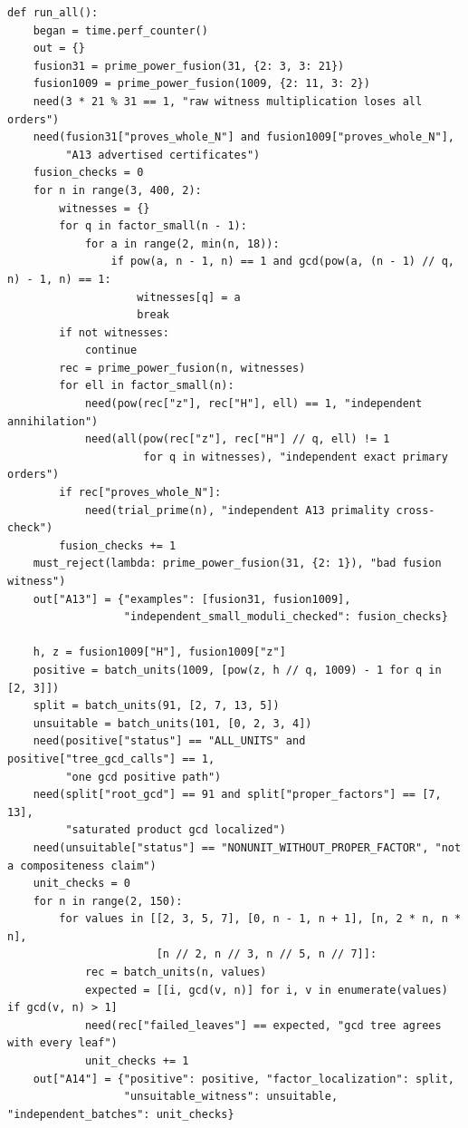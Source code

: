 \documentclass[11pt,a4paper]{article}
\theoremstyle{definition}\newtheorem{definition}[theorem]{Definition}
\theoremstyle{remark}\newtheorem{remark}[theorem]{Remark}
\begin{document}
\begin{lstlisting}[label=lst:certificates]
def run_all():
    began = time.perf_counter()
    out = {}
    fusion31 = prime_power_fusion(31, {2: 3, 3: 21})
    fusion1009 = prime_power_fusion(1009, {2: 11, 3: 2})
    need(3 * 21 % 31 == 1, "raw witness multiplication loses all orders")
    need(fusion31["proves_whole_N"] and fusion1009["proves_whole_N"],
         "A13 advertised certificates")
    fusion_checks = 0
    for n in range(3, 400, 2):
        witnesses = {}
        for q in factor_small(n - 1):
            for a in range(2, min(n, 18)):
                if pow(a, n - 1, n) == 1 and gcd(pow(a, (n - 1) // q, n) - 1, n) == 1:
                    witnesses[q] = a
                    break
        if not witnesses:
            continue
        rec = prime_power_fusion(n, witnesses)
        for ell in factor_small(n):
            need(pow(rec["z"], rec["H"], ell) == 1, "independent annihilation")
            need(all(pow(rec["z"], rec["H"] // q, ell) != 1
                     for q in witnesses), "independent exact primary orders")
        if rec["proves_whole_N"]:
            need(trial_prime(n), "independent A13 primality cross-check")
        fusion_checks += 1
    must_reject(lambda: prime_power_fusion(31, {2: 1}), "bad fusion witness")
    out["A13"] = {"examples": [fusion31, fusion1009],
                  "independent_small_moduli_checked": fusion_checks}

    h, z = fusion1009["H"], fusion1009["z"]
    positive = batch_units(1009, [pow(z, h // q, 1009) - 1 for q in [2, 3]])
    split = batch_units(91, [2, 7, 13, 5])
    unsuitable = batch_units(101, [0, 2, 3, 4])
    need(positive["status"] == "ALL_UNITS" and positive["tree_gcd_calls"] == 1,
         "one gcd positive path")
    need(split["root_gcd"] == 91 and split["proper_factors"] == [7, 13],
         "saturated product gcd localized")
    need(unsuitable["status"] == "NONUNIT_WITHOUT_PROPER_FACTOR", "not a compositeness claim")
    unit_checks = 0
    for n in range(2, 150):
        for values in [[2, 3, 5, 7], [0, n - 1, n + 1], [n, 2 * n, n * n],
                       [n // 2, n // 3, n // 5, n // 7]]:
            rec = batch_units(n, values)
            expected = [[i, gcd(v, n)] for i, v in enumerate(values) if gcd(v, n) > 1]
            need(rec["failed_leaves"] == expected, "gcd tree agrees with every leaf")
            unit_checks += 1
    out["A14"] = {"positive": positive, "factor_localization": split,
                  "unsuitable_witness": unsuitable, "independent_batches": unit_checks}


\end{lstlisting}
\end{document}
